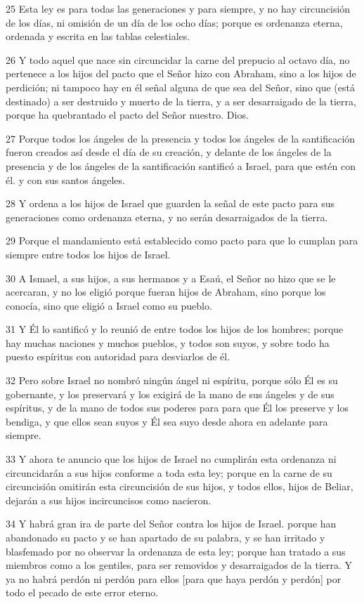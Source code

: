 \par 25 Esta ley es para todas las generaciones y para siempre, y no hay circuncisión de los días, ni omisión de un día de los ocho días; porque es ordenanza eterna, ordenada y escrita en las tablas celestiales.
\par 26 Y todo aquel que nace sin circuncidar la carne del prepucio al octavo día, no pertenece a los hijos del pacto que el Señor hizo con Abraham, sino a los hijos de perdición; ni tampoco hay en él señal alguna de que sea del Señor, sino que (está destinado) a ser destruido y muerto de la tierra, y a ser desarraigado de la tierra, porque ha quebrantado el pacto del Señor nuestro. Dios.
\par 27 Porque todos los ángeles de la presencia y todos los ángeles de la santificación fueron creados así desde el día de su creación, y delante de los ángeles de la presencia y de los ángeles de la santificación santificó a Israel, para que estén con él. y con sus santos ángeles.
\par 28 Y ordena a los hijos de Israel que guarden la señal de este pacto para sus generaciones como ordenanza eterna, y no serán desarraigados de la tierra.
\par 29 Porque el mandamiento está establecido como pacto para que lo cumplan para siempre entre todos los hijos de Israel.
\par 30 A Ismael, a sus hijos, a sus hermanos y a Esaú, el Señor no hizo que se le acercaran, y no los eligió porque fueran hijos de Abraham, sino porque los conocía, sino que eligió a Israel como su pueblo.
\par 31 Y Él lo santificó y lo reunió de entre todos los hijos de los hombres; porque hay muchas naciones y muchos pueblos, y todos son suyos, y sobre todo ha puesto espíritus con autoridad para desviarlos de él.
\par 32 Pero sobre Israel no nombró ningún ángel ni espíritu, porque sólo Él es su gobernante, y los preservará y los exigirá de la mano de sus ángeles y de sus espíritus, y de la mano de todos sus poderes para para que Él los preserve y los bendiga, y que ellos sean suyos y Él sea suyo desde ahora en adelante para siempre.
\par 33 Y ahora te anuncio que los hijos de Israel no cumplirán esta ordenanza ni circuncidarán a sus hijos conforme a toda esta ley; porque en la carne de su circuncisión omitirán esta circuncisión de sus hijos, y todos ellos, hijos de Beliar, dejarán a sus hijos incircuncisos como nacieron.
\par 34 Y habrá gran ira de parte del Señor contra los hijos de Israel. porque han abandonado su pacto y se han apartado de su palabra, y se han irritado y blasfemado por no observar la ordenanza de esta ley; porque han tratado a sus miembros como a los gentiles, para ser removidos y desarraigados de la tierra. Y ya no habrá perdón ni perdón para ellos [para que haya perdón y perdón] por todo el pecado de este error eterno.

